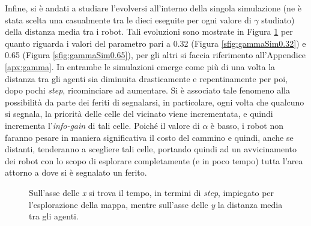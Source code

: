 Infine, si è andati a studiare l'evolversi all'interno della singola simulazione (ne è stata scelta una casualmente tra le dieci eseguite per ogni valore di $\gamma$ studiato) della distanza media tra i robot.
Tali evoluzioni sono mostrate in Figura \ref{fig:gammaSim} per quanto riguarda i valori del parametro pari a 0.32 (Figura \ref{sfig:gammaSim0.32}) e 0.65 (Figura \ref{sfig:gammaSim0.65}), per gli altri si faccia riferimento all'Appendice \ref{apx:gamma}.
In entrambe le simulazioni emerge come più di una volta la distanza tra gli agenti sia diminuita drasticamente e repentinamente per poi, dopo pochi \textit{step}, ricominciare ad aumentare.
Si è associato tale fenomeno alla possibilità da parte dei feriti di segnalarsi, in particolare, ogni volta che qualcuno si segnala, la priorità delle celle del vicinato viene incrementata, e quindi incrementa l'\textit{info-gain} di tali celle.
Poiché il valore di $\alpha$ è basso, i robot non faranno pesare in maniera significativa il costo del cammino e quindi, anche se distanti, tenderanno a scegliere tali celle, portando quindi ad un avvicinamento dei robot con lo scopo di esplorare completamente (e in poco tempo) tutta l'area attorno a dove si è segnalato un ferito.
\begin{figure}
	\hfill
	\caption{Sull'asse delle \textit{x} si trova il tempo, in termini di \textit{step}, impiegato per l'esplorazione della mappa, mentre sull'asse delle \textit{y} la distanza media tra gli agenti.}
	\label{fig:gammaSim}
\end{figure}

